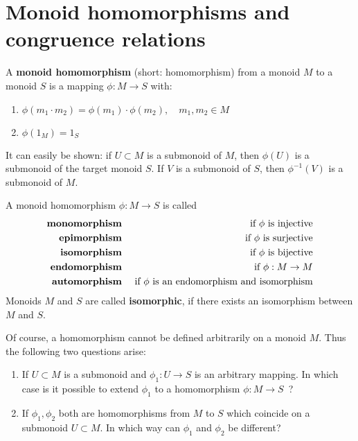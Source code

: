 \section{Monoid homomorphisms and congruence relations}

\begin{definition}
A {\bf monoid homomorphism} (short: homomorphism) from a monoid $M$ to a monoid
$S$ is a mapping $\phi : M \to S$ with:
\begin{enumerate}
  \item $\phi(m_1 \cdot m_2) = \phi(m_1) \cdot \phi(m_2), \quad m_1, m_2 \in M$
  \item $\phi(1_M) = 1_S$
\end{enumerate}
\end{definition}


It can easily be shown: if $U \subset M$ is a submonoid of $M$, then
$\phi(U)$ is a submonoid of the target monoid $S$. If $V$ is a submonoid of $S$,
then $\phi^{-1}(V)$ is a submonoid of $M$.

A monoid homomorphism $\phi: M \to S$ is called
\begin{eqnarray*}
\text{\bf monomorphism} & & \text{ if $\phi$ is injective} \\
\text{\bf epimorphism} & & \text{ if $\phi$ is surjective} \\
\text{\bf isomorphism} & & \text{ if $\phi$ is bijective} \\
\text{\bf endomorphism} & & \text{ if $\phi: M\to M$} \\
\text{\bf automorphism} & & \text{ if $\phi$ is an endomorphism and isomorphism}
\end{eqnarray*}
Monoids $M$ and $S$ are called {\bf isomorphic}, if there exists an
isomorphism between $M$ and $S$.

Of course, a homomorphism cannot be defined arbitrarily on a monoid $M$.
Thus the following two questions arise:
\begin{enumerate}
  \item If $U \subset M$ is a submonoid and $\phi_1 : U \to S$ is an arbitrary
mapping. In which case is it possible to extend $\phi_1$ to a homomorphism $\phi
: M \to S$\ ?
	\item If $\phi_1, \phi_2$ both are homomorphisms from $M$ to $S$ which
	coincide on a submonoid $U \subset M$. In which way can $\phi_1$ and $\phi_2$
	be different? 
\end{enumerate}

